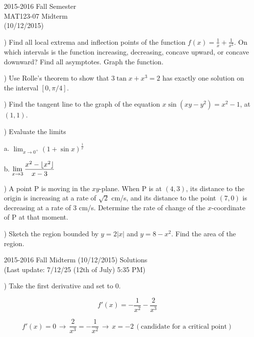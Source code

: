 \documentclass{article}
\DeclarePairedDelimiter\floor{\lfloor}{\rfloor}
\begin{document}
\pagestyle{empty}
\large

\begin{center}
2015-2016 Fall Semester\\MAT123-07 Midterm\\(10/12/2015)
\end{center}

) Find all local extrema and inflection points of the function $f(x) = \frac{1}{x} + \frac{1}{x^2}$. On which intervals is the function increasing, decreasing, concave upward, or concave downward? Find all asymptotes. Graph the function.


\hfill

) Use Rolle's theorem to show that $3\tan x + x^3 = 2$ has exactly one solution on the interval $[0,\pi/4]$.

\hfill

) Find the tangent line to the graph of the equation $x \sin(xy-y^2) = x^2-1$, at $(1,1)$.

\hfill

) Evaluate the limits

a. $\displaystyle \lim_{x\to 0^+} (1+\sin x)^{\frac{1}{x}}$

b. $\displaystyle \lim_{x\to 3} \frac{x^2-\floor{x^2}}{x-3}$

\hfill

) A point P is moving in the $xy$-plane. When P is at $(4, 3)$, its distance to the origin is increasing at a rate of $\sqrt{2}$ cm/s, and its distance to the point $(7, 0)$ is decreasing at a rate of 3 cm/s. Determine the rate of change of the $x$-coordinate of P at that moment.

\hfill

) Sketch the region bounded by $y=2|x|$ and $y=8-x^2$. Find the area of the region.

\newpage

\begin{center}
2015-2016 Fall Midterm (10/12/2015) Solutions\\
(Last update: 7/12/25 (12th of July) 5:35 PM)
\end{center}

) Take the first derivative and set to 0.

\begin{equation*}f'(x) = -\frac{1}{x^2} - \frac{2}{x^3}\end{equation*}

\begin{equation*}f'(x) = 0\,\rightarrow\,\frac{2}{x^3} = -\frac{1}{x^2}\,\rightarrow\,x = -2 \, (\text{candidate for a critical point})\end{equation*}
\end{document}
